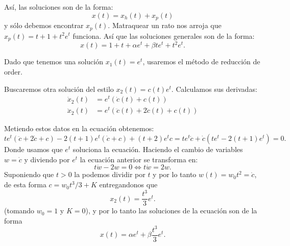 \documentclass[10pt]{article}
\begin{document}
\begin{plist}
Así, las soluciones son de la forma:
\[
    x(t) = x_h(t) + x_p(t)
\]
y sólo debemos encontrar \(x_p(t)\). Matraquear un rato nos arroja que \(x_p(t)
= t+1+t^2 e^t\) funciona. Así que las soluciones generales son de la forma:
\[
    x(t) = 1 + t + \alpha e^t + \beta t e^t + t^2 e^t
.\]
\item Dado que tenemos una solución \(x_1(t) = e^t\), usaremos el método de
reducción de order.

Buscaremos otra solución del estilo \(x_2(t) = c(t) e^t\). Calculamos sus
derivadas:
\begin{align*}
    \dot{x}_2(t) &= e^t (\dot{c}(t) + c(t))\\
    \ddot{x}_2(t) &= e^t (\ddot{c}(t) + 2\dot{c}(t) + c(t))
\end{align*}

Metiendo estos datos en la ecuación obtenemos:
\[
    te^t (\ddot{c} + 2\dot{c} + c)
    -
    2(t+1) e^t (\dot{c} + c)
    +
    (t+2) e^t c
    =
    te^t \ddot{c} + \dot{c} (te^t - 2(t+1) e^t)
    =
    0
.\]
Donde usamos que \(e^t\) soluciona la ecuación. Haciendo el cambio de variables
\(w = \dot{c}\) y diviendo por \(e^t\) la ecuación anterior se transforma en:
\[
    t\dot{w} -2 w = 0
    \iff
    t \dot{w} = 2w
.\]
Suponiendo que \(t > 0\) la podemos dividir por \(t\) y por lo tanto \(w(t) =
w_0 t^2 = \dot{c}\), de esta forma \(c = w_0 t^3/3 + K\) entregandonos que
\[
    x_2(t) = \frac{t^3}{3} e^t
.\]
(tomando \(w_0=1\) y \(K = 0\)), y por lo tanto las soluciones de la ecuación
son de la forma
\[
    x(t) = \alpha e^t + \beta \frac{t^3}{3} e^t
.\]
\end{plist}
\end{document}
